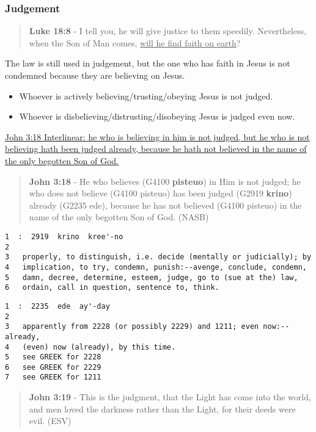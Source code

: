 \documentclass[11pt]{article}
\begin{document}
\subsubsection{Judgement}
\label{sec:org9ca6967}
\begin{quote}
\textbf{Luke 18:8} - I tell you, he will give justice to them speedily. Nevertheless, when the Son of Man comes, \uline{will he find faith on earth}?
\end{quote}

The law is still used in judgement, but the one who has faith in Jesus is not condemned because they are believing on Jesus.

\begin{itemize}
\item Whoever is actively believing/trusting/obeying Jesus is not judged.
\item Whoever is disbelieving/distrusting/disobeying Jesus is judged even now.
\end{itemize}

\href{https://biblehub.com/interlinear/john/3-18.htm}{John 3:18 Interlinear: he who is believing in him is not judged, but he who is not believing hath been judged already, because he hath not believed in the name of the only begotten Son of God.}

\begin{quote}
\textbf{John 3:18} - He who believes (G4100 \textbf{pisteuo}) in Him is not judged; he who does not believe (G4100 pisteuo) has been judged (G2919 \textbf{krino}) already (G2235 ede), because he has not believed (G4100 pisteuo) in the name of the only begotten Son of God. (NASB)
\end{quote}

\begin{verbatim}
1  :  2919  krino  kree'-no
2  
3   properly, to distinguish, i.e. decide (mentally or judicially); by
4   implication, to try, condemn, punish:--avenge, conclude, condemn,
5   damn, decree, determine, esteem, judge, go to (sue at the) law,
6   ordain, call in question, sentence to, think.
\end{verbatim}

\begin{verbatim}
1  :  2235  ede  ay'-day
2  
3   apparently from 2228 (or possibly 2229) and 1211; even now:--already,
4   (even) now (already), by this time.
5   see GREEK for 2228
6   see GREEK for 2229
7   see GREEK for 1211
\end{verbatim}

\begin{quote}
\textbf{John 3:19} - This is the judgment, that the Light has come into the world, and men loved the darkness rather than the Light, for their deeds were evil. (ESV)
\end{quote}
\end{document}
